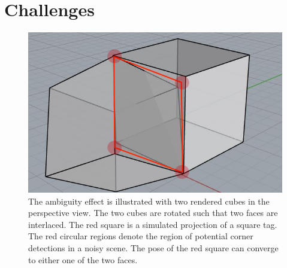 \section{Challenges}
\label{sec:problem}


\begin{figure}
\centering
\includegraphics[width=\columnwidth]{figs/perspective_fig}
\caption{The ambiguity effect is illustrated with two rendered cubes in the perspective view. The two cubes are rotated such that two faces are interlaced. The red square is a simulated projection of a square tag. The red circular regions denote the region of potential corner detections in a noisy scene. The pose of the red square can converge to either one of the two faces.}
\label{fig:cube}
\end{figure}

